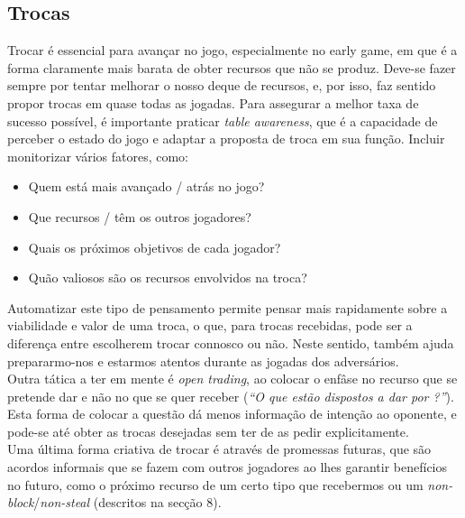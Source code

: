 \documentclass[12pt]{article}
\begin{document}
\subsection{Trocas}
Trocar é essencial para avançar no jogo, especialmente no early game, em que é a forma claramente mais barata de obter recursos que não se produz.
Deve-se fazer sempre por tentar melhorar o nosso deque de recursos, e, por isso, faz sentido propor trocas em quase todas as jogadas.
Para assegurar a melhor taxa de sucesso possível, é importante praticar \textit{table awareness}, que é a capacidade de perceber o estado do jogo e adaptar a proposta de troca em sua função. 
Incluir monitorizar vários fatores, como:
\vspace{-0.2cm}
\begin{itemize}[noitemsep]
    \item Quem está mais avançado / atrás no jogo?
    \item Que recursos /  têm os outros jogadores?
    \item Quais os próximos objetivos de cada jogador?
    \item Quão valiosos são os recursos envolvidos na troca?
\end{itemize}
\vspace{-0.2cm}
Automatizar este tipo de pensamento permite pensar mais rapidamente sobre a viabilidade e valor de uma troca, o que, para trocas recebidas, pode ser a diferença entre escolherem trocar connosco ou não.
Neste sentido, também ajuda prepararmo-nos e estarmos atentos durante as jogadas dos adversários. \\
Outra tática a ter em mente é \textit{open trading}, ao colocar o enfâse no recurso que se pretende dar e não no que se quer receber (\textit{``O que estão dispostos a dar por ?''}).
Esta forma de colocar a questão dá menos informação de intenção ao oponente, e pode-se até obter as trocas desejadas sem ter de as pedir explicitamente. \\
Uma última forma criativa de trocar é através de promessas futuras, que são acordos informais que se fazem com outros jogadores ao lhes garantir benefícios no futuro, como o próximo recurso de um certo tipo que recebermos ou um \textit{non-block}/\textit{non-steal} (descritos na secção 8).
\end{document}
